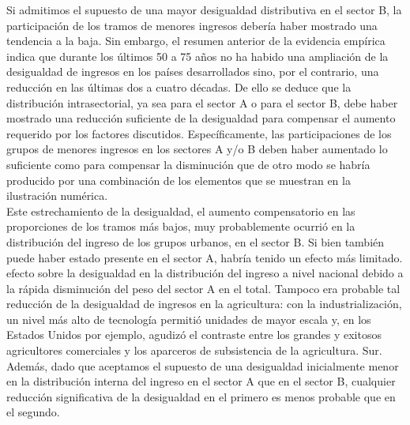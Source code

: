 Si admitimos el supuesto de una mayor desigualdad distributiva en el sector B, la participación de los tramos de menores ingresos debería haber mostrado una tendencia a la baja. Sin embargo, el resumen anterior de la evidencia empírica indica que durante los últimos 50 a 75 años no ha habido una ampliación de la desigualdad de ingresos en los países desarrollados sino, por el contrario, una reducción en las últimas dos a cuatro décadas. De ello se deduce que la distribución intrasectorial, ya sea para el sector A o para el sector B, debe haber mostrado una reducción suficiente de la desigualdad para compensar el aumento requerido por los factores discutidos. Específicamente, las participaciones de los grupos de menores ingresos en los sectores A y/o B deben haber aumentado lo suficiente como para compensar la disminución que de otro modo se habría producido por una combinación de los elementos que se muestran en la ilustración numérica.\\

Este estrechamiento de la desigualdad, el aumento compensatorio en las proporciones de los tramos más bajos, muy probablemente ocurrió en la distribución del ingreso de los grupos urbanos, en el sector B. Si bien también puede haber estado presente en el sector A, habría tenido un efecto más limitado. efecto sobre la desigualdad en la distribución del ingreso a nivel nacional debido a la rápida disminución del peso del sector A en el total. Tampoco era probable tal reducción de la desigualdad de ingresos en la agricultura: con la industrialización, un nivel más alto de tecnología permitió unidades de mayor escala y, en los Estados Unidos por ejemplo, agudizó el contraste entre los grandes y exitosos agricultores comerciales y los aparceros de subsistencia de la agricultura. Sur. Además, dado que aceptamos el supuesto de una desigualdad inicialmente menor en la distribución interna del ingreso en el sector A que en el sector B, cualquier reducción significativa de la desigualdad en el primero es menos probable que en el segundo.

